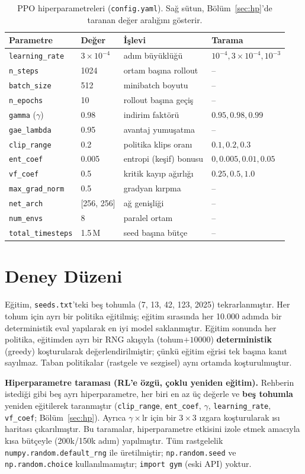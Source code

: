 \documentclass[11pt,a4paper]{article}
\newcommand{\reff}[1]{\texttt{#1}}
\begin{document}
\begin{table}[h]
\centering\small
\caption{PPO hiperparametreleri (\reff{config.yaml}). Sağ sütun, Bölüm~\ref{sec:hp}'de
taranan değer aralığını gösterir.}
\begin{tabular}{@{}llp{4.2cm}l@{}}
\toprule
Parametre & Değer & İşlevi & Tarama \\
\midrule
\reff{learning\_rate} & $3\times10^{-4}$ & adım büyüklüğü & $10^{-4},3\!\times\!10^{-4},10^{-3}$ \\
\reff{n\_steps} & 1024 & ortam başına rollout & -- \\
\reff{batch\_size} & 512 & minibatch boyutu & -- \\
\reff{n\_epochs} & 10 & rollout başına geçiş & -- \\
\reff{gamma} ($\gamma$) & 0.98 & indirim faktörü & $0.95, 0.98, 0.99$ \\
\reff{gae\_lambda} & 0.95 & avantaj yumuşatma & -- \\
\reff{clip\_range} & 0.2 & politika klips oranı & $0.1, 0.2, 0.3$ \\
\reff{ent\_coef} & 0.005 & entropi (keşif) bonusu & $0, 0.005, 0.01, 0.05$ \\
\reff{vf\_coef} & 0.5 & kritik kayıp ağırlığı & $0.25, 0.5, 1.0$ \\
\reff{max\_grad\_norm} & 0.5 & gradyan kırpma & -- \\
\reff{net\_arch} & [256, 256] & ağ genişliği & -- \\
\reff{num\_envs} & 8 & paralel ortam & -- \\
\reff{total\_timesteps} & 1.5\,M & seed başına bütçe & -- \\
\bottomrule
\end{tabular}
\end{table}

\section{Deney Düzeni}
Eğitim, \reff{seeds.txt}'teki beş tohumla (7, 13, 42, 123, 2025) tekrarlanmıştır.
Her tohum için ayrı bir politika eğitilmiş; eğitim sırasında her 10.000 adımda bir
deterministik eval yapılarak en iyi model saklanmıştır. Eğitim sonunda her politika,
eğitimden ayrı bir RNG akışıyla (tohum$+10000$) \textbf{deterministik} (greedy)
koşturularak değerlendirilmiştir; çünkü eğitim eğrisi tek başına kanıt sayılmaz.
Taban politikalar (rastgele ve sezgisel) aynı ortamda koşturulmuştur.

\textbf{Hiperparametre taraması (RL'e özgü, çoklu yeniden eğitim).} Rehberin istediği
gibi beş ayrı hiperparametre, her biri en az üç değerle ve \textbf{beş tohumla}
yeniden eğitilerek taranmıştır (\reff{clip\_range}, \reff{ent\_coef}, $\gamma$,
\reff{learning\_rate}, \reff{vf\_coef}; Bölüm~\ref{sec:hp}). Ayrıca $\gamma\times$lr
için bir $3\times3$ ızgara koşturularak ısı haritası çıkarılmıştır. Bu taramalar,
hiperparametre etkisini izole etmek amacıyla kısa bütçeyle (200k/150k adım)
yapılmıştır. Tüm rastgelelik \reff{numpy.random.default\_rng} ile üretilmiştir;
\reff{np.random.seed} ve \reff{np.random.choice} kullanılmamıştır;
\reff{import gym} (eski API) yoktur.
\end{document}
